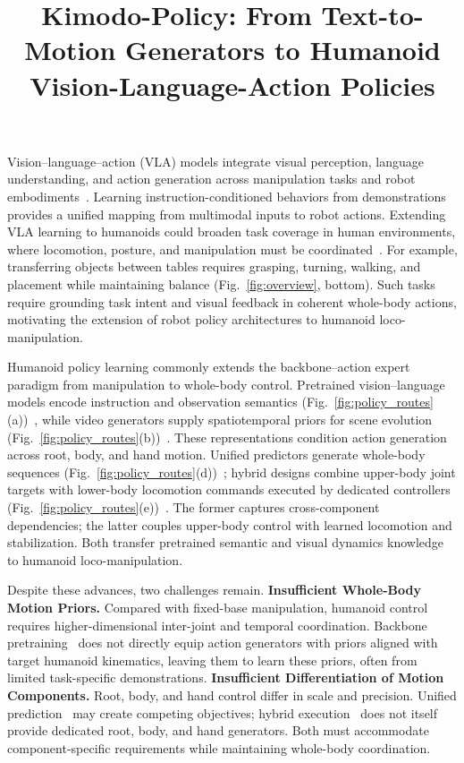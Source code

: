 \documentclass{article}
\title{Kimodo-Policy: From Text-to-Motion Generators to Humanoid Vision-Language-Action Policies}
\begin{document}
Vision--language--action (VLA) models integrate visual perception, language understanding, and action generation across manipulation tasks and robot embodiments~\cite{rt2,openvla,pi0,wang2026limitsvisionandlanguagenavigation,wang2025dreamnavtrajectorybasedimaginativeframework}.
Learning instruction-conditioned behaviors from demonstrations provides a unified mapping from multimodal inputs to robot actions.
Extending VLA learning to humanoids could broaden task coverage in human environments, where locomotion, posture, and manipulation must be coordinated~\cite{grootn1,psi0,openhlm}.
For example, transferring objects between tables requires grasping, turning, walking, and placement while maintaining balance (Fig.~\ref{fig:overview}, bottom).
Such tasks require grounding task intent and visual feedback in coherent whole-body actions, motivating the extension of robot policy architectures to humanoid loco-manipulation.
\par\bigskip
Humanoid policy learning commonly extends the backbone--action expert paradigm from manipulation to whole-body control.
Pretrained vision--language models encode instruction and observation semantics (Fig.~\ref{fig:policy_routes}(a))~\cite{grootn1,psi0,openhlm}, while video generators supply spatiotemporal priors for scene evolution (Fig.~\ref{fig:policy_routes}(b))~\cite{motionwam,wholebodywam_wbc}.
These representations condition action generation across root, body, and hand motion.
Unified predictors generate whole-body sequences (Fig.~\ref{fig:policy_routes}(d))~\cite{openhlm,motionwam}; hybrid designs combine upper-body joint targets with lower-body locomotion commands executed by dedicated controllers (Fig.~\ref{fig:policy_routes}(e))~\cite{humanoidexo,wholebodyvla}.
The former captures cross-component dependencies; the latter couples upper-body control with learned locomotion and stabilization.
Both transfer pretrained semantic and visual dynamics knowledge to humanoid loco-manipulation.
\par\bigskip
Despite these advances, two challenges remain.
\textbf{ Insufficient Whole-Body Motion Priors.}
Compared with fixed-base manipulation, humanoid control requires higher-dimensional inter-joint and temporal coordination. Backbone pretraining~\cite{grootn1,psi0,motionwam,wholebodywam_wbc} does not directly equip action generators with priors aligned with target humanoid kinematics, leaving them to learn these priors, often from limited task-specific demonstrations.
\textbf{ Insufficient Differentiation of Motion Components.}
Root, body, and hand control differ in scale and precision. Unified prediction~\cite{openhlm,motionwam} may create competing objectives; hybrid execution~\cite{humanoidexo,wholebodyvla} does not itself provide dedicated root, body, and hand generators. Both must accommodate component-specific requirements while maintaining whole-body coordination.
\par\bigskip
\end{document}
